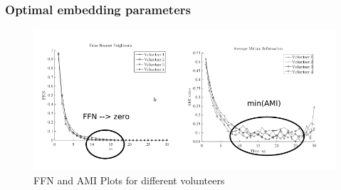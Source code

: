 \documentclass{beamer}
\theoremstyle{definition}
\begin{document}
% 
% 



\begin{bibunit}[apalike]
\begin{frame}
\frametitle{Optimal embedding parameters}

\begin{figure}
\includegraphics[scale=0.4]{fnnami}
\caption{FFN and AMI Plots for different volunteers \cite{Sama2013} }
\end{figure}
  \vfill
\end{frame}
\end{bibunit}



% 
% 
% 
\end{document}
